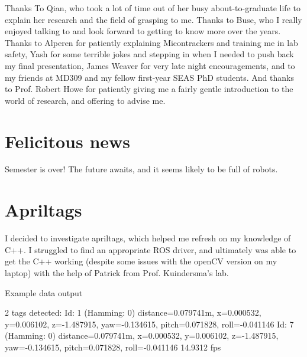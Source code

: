 \documentclass[preprint,12pt,3p]{elsarticle}
\begin{document}
Thanks To Qian, who took a lot of time out of her busy about-to-graduate life to explain her
research and the field of grasping to me. Thanks to Buse, who I really enjoyed talking to and look
forward to getting to know more over the years. Thanks to Alperen for patiently explaining
Micontrackers and training me in lab safety, Yash for some terrible jokes and stepping in when I
needed to push back my final presentation, James Weaver for very late night encouragements, and to
my friends at MD309 and my fellow first-year SEAS PhD students.  And thanks to Prof. Robert Howe for 
patiently giving me a fairly gentle introduction to the world of research, and offering to advise
me.

\section{Felicitous news}

Semester is over! The future awaits, and it seems likely to be full of robots.

\newpage

\clearpage
\vspace*{\fill}
\begin{center}
\begin{minipage}{.6\textwidth}
\Huge
{}
\normalsize
\end{minipage}
\end{center}
\vfill %
\clearpage

\appendix

\section{Apriltags}
I decided to investigate apriltags, which helped me refresh on my knowledge of C++. I struggled to
find an appropriate ROS driver, and ultimately was able to get the C++ working (despite some issues
with the openCV version on my laptop) with the help of Patrick from Prof. Kuindersma's lab.

Example data output
\begin{ttlisting}
2 tags detected: 
Id: 1 (Hamming: 0) distance=0.079741m, x=0.000532, y=0.006102, z=-1.487915, yaw=-0.134615, pitch=0.071828, roll=-0.041146
Id: 7 (Hamming: 0) distance=0.079741m, x=0.000532, y=0.006102, z=-1.487915, yaw=-0.134615, pitch=0.071828, roll=-0.041146
14.9312 fps
\end{ttlisting}
\end{document}

